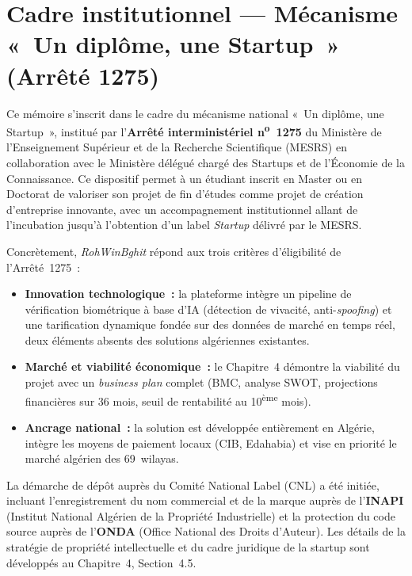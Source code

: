 \documentclass[12pt, a4paper, oneside]{report}
\begin{document}
\section*{Cadre institutionnel --- Mécanisme «~Un diplôme, une Startup~» (Arrêté 1275)}

Ce mémoire s'inscrit dans le cadre du mécanisme national «~Un diplôme, une Startup~», institué par l'\textbf{Arrêté interministériel n\textsuperscript{o}~1275} du Ministère de l'Enseignement Supérieur et de la Recherche Scientifique (MESRS) en collaboration avec le Ministère délégué chargé des Startups et de l'Économie de la Connaissance. Ce dispositif permet à un étudiant inscrit en Master ou en Doctorat de valoriser son projet de fin d'études comme projet de création d'entreprise innovante, avec un accompagnement institutionnel allant de l'incubation jusqu'à l'obtention d'un label \textit{Startup} délivré par le MESRS.

Concrètement, \textit{RohWinBghit} répond aux trois critères d'éligibilité de l'Arrêté~1275~:\\
\begin{itemize}[leftmargin=2em]
  \item \textbf{Innovation technologique~:} la plateforme intègre un pipeline de vérification biométrique à base d'IA (détection de vivacité, anti-\textit{spoofing}) et une tarification dynamique fondée sur des données de marché en temps réel, deux éléments absents des solutions algériennes existantes.
  \item \textbf{Marché et viabilité économique~:} le Chapitre~4 démontre la viabilité du projet avec un \textit{business plan} complet (BMC, analyse SWOT, projections financières sur 36 mois, seuil de rentabilité au 10\textsuperscript{ème} mois).
  \item \textbf{Ancrage national~:} la solution est développée entièrement en Algérie, intègre les moyens de paiement locaux (CIB, Edahabia) et vise en priorité le marché algérien des 69~wilayas.
\end{itemize}

La démarche de dépôt auprès du Comité National Label (CNL) a été initiée, incluant l'enregistrement du nom commercial et de la marque auprès de l'\textbf{INAPI} (Institut National Algérien de la Propriété Industrielle) et la protection du code source auprès de l'\textbf{ONDA} (Office National des Droits d'Auteur). Les détails de la stratégie de propriété intellectuelle et du cadre juridique de la startup sont développés au Chapitre~4, Section~4.5.
\end{document}
